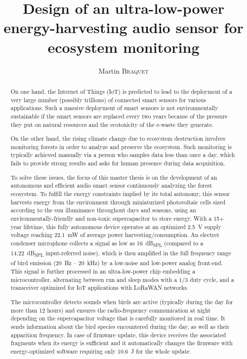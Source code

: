 \documentclass{EPL-master-thesis-covers-EN}
\title{Design of an ultra-low-power energy-harvesting audio sensor for ecosystem monitoring}
\author{Martin \textsc{Braquet}\!\nnfootnote{\url{martin.braquet@hotmail.com}}}
\begin{document}
\hypersetup{pageanchor=false}

\maketitle

\begin{abstract}

On one hand, the Internet of Things (IoT) is predicted to lead to the deployment of a very large number (possibly trillions) of connected smart sensors for various applications. Such a massive deployment of smart sensors is not environmentally sustainable if the smart sensors are replaced every two years because of the pressure they put on natural resources and the ecotoxicity of the e-waste they generate.

On the other hand, the rising climate change due to ecosystem destruction involves monitoring forests in order to analyze and preserve the ecosystem. Such monitoring is typically achieved manually via a person who samples data less than once a day, which fails to provide strong results and asks for human presence during data acquisition.

To solve these issues, the focus of this master thesis is on the development of an autonomous and efficient audio smart sensor continuously analyzing the forest ecosystem. To fulfill the energy constraints implied by its total autonomy, this sensor harvests energy from the environment through miniaturized photovoltaic cells sized according to the sun illuminance throughout days and seasons, using an environmentally-friendly and non-toxic supercapacitor to store energy.
With a 15+ year lifetime, this fully autonomous device operates at an optimized \SI{2.5}{V} supply voltage reaching \SI{22.1}{mW} of average power harvesting/consumption. An electret condenser microphone collects a signal as low as \SI{16}{dB_{SPL}} (compared to a \SI{14.22}{dB_{SPL}} input-referred noise), which is then amplified in the full frequency range of bird emission (\SI{20}{Hz} -- \SI{20}{kHz}) by a low-noise and low-power analog front-end. This signal is further processed in an ultra-low-power chip embedding a microcontroller, alternating between run and sleep modes with a $1/3$ duty cycle, and a transceiver optimized for IoT applications with LoRaWAN networks. 

The microcontroller detects sounds when birds are active (typically during the day for more than 12 hours) and ensures the radio-frequency communication at night depending on the supercapacitor voltage that is carefully monitored in real time. It sends information about the bird species encountered during the day, as well as their apparition frequency. In case of firmware update, this device receives the associated fragments when its energy is sufficient and it automatically changes the firmware with energy-optimized software requiring only \SI{10.6}{J} for the whole update.


\end{abstract}
\end{document}
